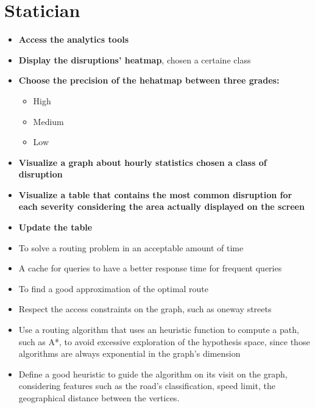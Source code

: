 \section{Statician}
\begin{itemize}
	\item \textbf{Access the analytics tools}
	\item \textbf{Display the disruptions' heatmap}, chosen a certaine class
	\item \textbf{Choose the precision of the hehatmap between three grades:}
		\begin{itemize}
		\item High
		\item Medium
		\item Low
		\end{itemize}
	\item \textbf{Visualize a graph about hourly statistics chosen a class of disruption}
	\item \textbf{Visualize a table that contains the most common disruption for each severity considering the area actually displayed on the screen}
	\item \textbf{Update the table}
\end{itemize}

	\begin{itemize}
	\item To solve a routing problem in an acceptable amount of time
	\item A cache for queries to have a better response time for frequent queries
	\item To find a good approximation of the optimal route
	\item Respect the access constraints on the graph, such as oneway streets
	\item Use a routing algorithm that uses an heuristic function to compute a path, such as A*, to avoid excessive exploration of the hypothesis space, since those algorithms are always exponential in the graph’s dimension
	\item Define a good heuristic to guide the algorithm on its visit on the graph, considering features such as the road’s classification, speed limit, the geographical distance between the vertices.
	\end{itemize}


